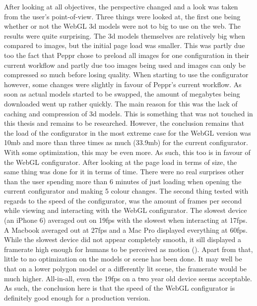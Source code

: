 After looking at all objectives, the perspective changed and a look was taken from the user's point-of-view. Three things were looked at, the first one being whether or not the WebGL 3d models were not to big to use on the web. The results were quite surprising. The 3d models themselves are relatively big when compared to images, but the initial page load was smaller. This was partly due too the fact that Peppr chose to preload all images for one configuration in their current workflow and partly due too images being used and images can only be compressed so much before losing quality. When starting to use the configurator however, some changes were slightly in favour of Peppr's current workflow. As soon as actual models started to be swapped, the amount of megabytes being downloaded went up rather quickly. The main reason for this was the lack of caching and compression of 3d models. This is something that was not touched in this thesis and remains to be researched. However, the conclusion remains that the load of the configurator in the most extreme case for the WebGL version was 10mb and more than three times as much (33.9mb) for the current configurator. With some optimization, this may be even more. As such, this too is in favour of the WebGL configurator. \newline
After looking at the page load in terms of size, the same thing was done for it in terms of time. There were no real surprises other than the user spending more than 6 minutes of just loading when opening the current configurator and making 5 colour changes. The second thing tested with regards to the speed of the configurator, was the amount of frames per second while viewing and interacting with the WebGL configurator. The slowest device (an iPhone 6) averaged out on 19fps with the slowest when interacting at 17fps. A Macbook averaged out at 27fps and a Mac Pro displayed everything at 60fps. While the slowest device did not appear completely smooth, it sill displayed a framerate high enough for humans to be perceived as motion (\cite{frameRate}). Apart from that, little to no optimization on the models or scene has been done. It may well be that on a lower polygon model or a differently lit scene, the framerate would be much higher. All-in-all, even the 19fps on a two year old device seems acceptable. As such, the conclusion here is that the speed of the WebGL configurator is definitely good enough for a production version. \newline
